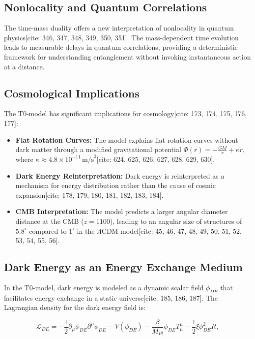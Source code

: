 \documentclass[a4paper,12pt]{article}
\theoremstyle{definition}
\theoremstyle{remark}
\begin{document}
	\subsection{Nonlocality and Quantum Correlations}
	
	The time-mass duality offers a new interpretation of nonlocality in quantum physics[cite: 346, 347, 348, 349, 350, 351]. The mass-dependent time evolution leads to measurable delays in quantum correlations, providing a deterministic framework for understanding entanglement without invoking instantaneous action at a distance.
	
	\subsection{Cosmological Implications}
	
	The T0-model has significant implications for cosmology[cite: 173, 174, 175, 176, 177]:
	
	\begin{itemize}
		\item \textbf{Flat Rotation Curves:} The model explains flat rotation curves without dark matter through a modified gravitational potential \( \Phi(r) = -\frac{G M}{r} + \kappa r \), where \( \kappa \approx 4.8 \times 10^{-11} \, \text{m/s}^2 \)[cite: 624, 625, 626, 627, 628, 629, 630].
		\item \textbf{Dark Energy Reinterpretation:} Dark energy is reinterpreted as a mechanism for energy distribution rather than the cause of cosmic expansion[cite: 178, 179, 180, 181, 182, 183, 184].
		\item \textbf{CMB Interpretation:} The model predicts a larger angular diameter distance at the CMB (\( z = 1100 \)), leading to an angular size of structures of \( 5.8^\circ \) compared to \( 1^\circ \) in the \( \Lambda \)CDM model[cite: 45, 46, 47, 48, 49, 50, 51, 52, 53, 54, 55, 56].
	\end{itemize}
	
	\subsection{Dark Energy as an Energy Exchange Medium}
	
	In the T0-model, dark energy is modeled as a dynamic scalar field \(\phi_{DE}\) that facilitates energy exchange in a static universe[cite: 185, 186, 187]. The Lagrangian density for the dark energy field is:
	
	\begin{equation}
		\mathcal{L}_{DE} = -\frac{1}{2} \partial_\mu \phi_{DE} \partial^\mu \phi_{DE} - V(\phi_{DE}) - \frac{\beta}{M_{Pl}} \phi_{DE} T^{\mu}_{\mu} - \frac{1}{2} \xi \phi_{DE}^2 R,
	\end{equation}
	
\end{document}
